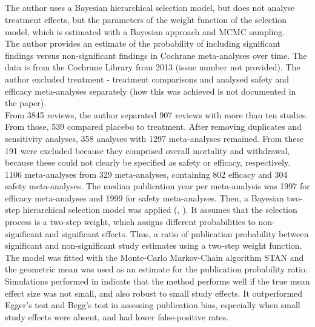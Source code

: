 \documentclass[11pt,a4paper,twoside]{book}\usepackage[]{graphicx}\usepackage[]{color}
\begin{document}
\subsection{\citealp{kicinsky}}
The author uses a Bayesian hierarchical selection model, but does not analyse treatment effects, but the parameters of the weight function of the selection model, which is estimated with a Bayesian approach and MCMC sampling. \\
The author provides an estimate of the probability of including significant findings versus non-significant findings in Cochrane meta-analyses over time. The data is from the Cochrane Library from 2013 (issue number not provided). The author excluded treatment - treatment comparisons and analysed safety and efficacy meta-analyses separately (how this was achieved is not documented in the paper). \\
From 3845 reviews, the author separated 907 reviews with more than ten studies. From those, 539 compared placebo to treatment. After removing duplicates and sensitivity analyses, 358 analyses with 1297 meta-analyses remained. From these 191 were excluded because they comprised overall mortality and withdrawal, because these could not clearly be specified as safety or efficacy, respectively. \\
1106 meta-analyses from 329 meta-analyses, containing 802 efficacy and 304 safety meta-analyses. The median publication year per meta-analysis was 1997 for efficacy meta-analyses and 1999 for safety meta-analyses. Then, a Bayesian two-step hierarchical selection model was applied (\citealp{bayesian.selection.model}, \citealp{bayesian.selection.model.2}). It assumes that the selection process is a two-step weight, which assigns different probabilities to non-significant and significant effects. Thus, a ratio of publication probability between significant and non-significant study estimates using a two-step weight function. The model was fitted with the Monte-Carlo Markov-Chain algorithm STAN and the geometric mean was used as an estimate for the publication probability ratio. Simulations performed in \citep{bayesian.selection.model} indicate that the method performs well if the true mean effect size was not small, and also robust to small study effects. It outperformed Egger's test and Begg's test in assessing publication bias, especially when small study effects were absent, and had lower false-positive rates. \\
\end{document}
